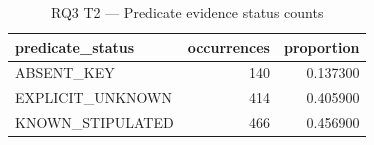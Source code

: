 \begin{table}
\caption{RQ3 T2 — Predicate evidence status counts}
\label{tab:rq3_t2_predicate_statuses}
\begin{tabular}{lrr}
\toprule
predicate\_status & occurrences & proportion \\
\midrule
ABSENT\_KEY & 140 & 0.137300 \\
EXPLICIT\_UNKNOWN & 414 & 0.405900 \\
KNOWN\_STIPULATED & 466 & 0.456900 \\
\bottomrule
\end{tabular}
\end{table}

